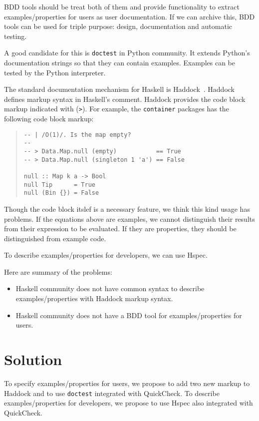\documentclass[preprint]{sigplanconf}
\newcommand{\hspec}{Hspec}
\begin{document}
BDD tools should be treat both of them and provide functionality
to extract examples/properties for users as user documentation.
If we can archive this, BDD tools can be used for
triple purpose: design, documentation and automatic testing.

A good candidate for this is {\tt doctest} in Python community.
It extends Python's documentation strings so that they
can contain examples.
Examples can be tested by the Python interpreter.

The standard documentation mechanism for Haskell is
Haddock~\cite{haddock}.
Haddock defines markup syntax in Haskell's comment.
Haddock provides the code block markup indicated with ({\tt >}).
For example, the {\tt container} packages has the following code block markup:

\begin{quote}
\small
\begin{verbatim}
-- | /O(1)/. Is the map empty?
--
-- > Data.Map.null (empty)           == True
-- > Data.Map.null (singleton 1 'a') == False

null :: Map k a -> Bool
null Tip      = True
null (Bin {}) = False
\end{verbatim}
\end{quote}

\noindent Though the code block itslef is a necessary feature,
we think this kind usage has problems.
If the equations above are examples, we cannot distinguish
their results from their expression to be evaluated.
If they are properties, they should be distinguished
from example code.

To describe examples/properties for developers, we can use \hspec{}.

Here are summary of the problems:

\begin{itemize}
\item Haskell community does not have common syntax to describe
examples/properties with Haddock markup syntax.
\item Haskell community does not have a BDD tool for 
examples/properties for users.
\end{itemize}

\section{Solution}

To specify examples/properties for users, we propose to add two new markup to Haddock and to use {\tt doctest} integrated with QuickCheck. To describe examples/properties for developers, we propose to use \hspec{} also integrated with QuickCheck.
\end{document}
